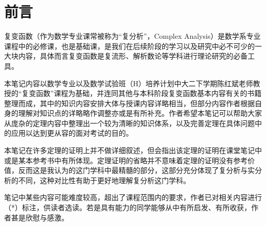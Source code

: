 \chapter*{前言}

复变函数（作为数学专业课常被称为“复分析”，Complex Analysis）是数学系专业课程中的必修课，也是基础课，是我们在后续阶段的学习以及研究中必不可少的一大块内容，具体而言复变函数是复流形、解析数论等学科进行理论研究的必备工具。

本笔记内容以数学专业以及数学试验班（H）培养计划中大二下学期陈红斌老师教授的“复变函数”课程为基础，并连同其他与本科阶段复变函数基本内容有关的书籍整理而成，其中的知识内容安排大体与授课内容详略相当，但部分内容作者根据自身的理解对知识点的详略略作调整亦或是有所补充。作者希望本笔记可以帮助大家从庞杂的定理内容中整理出一个较为清晰的知识体系，以及完善定理在具体问题中的应用以达到更从容的面对考试的目的。

本笔记在许多定理的证明上并不做详细叙述，但会指出该定理的证明在课堂笔记中或是某本参考书中有所体现。定理证明的省略并不意味着定理的证明没有参考价值，反而这是我认为的这门学科中最精髓的部分，这部分充分体现了复分析与实分析的不同，这种对比性有助于更好地理解复分析这门学科。

笔记中某些内容可能难度较高，超出了课程范围内的要求，作者已对相关内容进行（*）标注，供读者选读。若是具有能力的同学能够从中有所启发、有所收获，作者甚是欣慰与感激。

\vspace{1em}
\makeatletter
\begin{flushright}
	\@author\\
	\@date
\end{flushright}
\makeatother

\clearemptydoublepage
\tableofcontents
